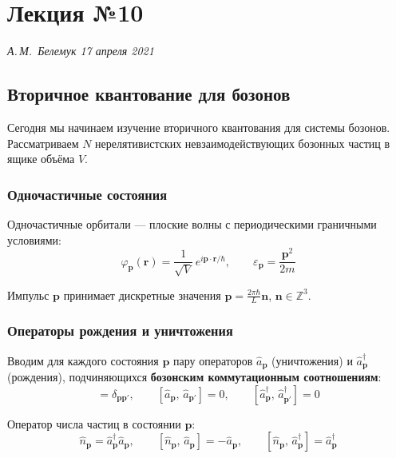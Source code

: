 \documentclass[../general/general]{subfiles}
\begin{document}
\chapter{Лекция №10}
\noindent\textit{А.\,М.~Белемук \hfill 17 апреля 2021}
\vspace{1em}
\ifSubfilesClassLoaded{\tableofcontents\newpage}{}


\section{Вторичное квантование для бозонов}

Сегодня мы начинаем изучение вторичного квантования для системы бозонов. Рассматриваем $N$ нерелятивистских невзаимодействующих бозонных частиц в ящике объёма $V$.

\subsection{Одночастичные состояния}

Одночастичные орбитали --- плоские волны с периодическими граничными условиями:
\begin{equation}
    \varphi_\mathbf{p}(\mathbf{r}) = \frac{1}{\sqrt{V}}\,e^{i\mathbf{p}\cdot\mathbf{r}/\hbar}, \qquad \varepsilon_\mathbf{p} = \frac{\mathbf{p}^2}{2m}
\end{equation}

Импульс $\mathbf{p}$ принимает дискретные значения $\mathbf{p} = \frac{2\pi\hbar}{L}\mathbf{n}$, $\mathbf{n} \in \mathbb{Z}^3$.

\subsection{Операторы рождения и уничтожения}

Вводим для каждого состояния $\mathbf{p}$ пару операторов $\hat{a}_\mathbf{p}$ (уничтожения) и $\hat{a}^\dagger_\mathbf{p}$ (рождения), подчиняющихся \textbf{бозонским коммутационным соотношениям}:
\begin{equation}
    [\hat{a}_\mathbf{p},\,\hat{a}^\dagger_{\mathbf{p}'}] = \delta_{\mathbf{p}\mathbf{p}'}, \qquad
    [\hat{a}_\mathbf{p},\,\hat{a}_{\mathbf{p}'}] = 0, \qquad
    [\hat{a}^\dagger_\mathbf{p},\,\hat{a}^\dagger_{\mathbf{p}'}] = 0
    \label{eq:bose_comm}
\end{equation}

Оператор числа частиц в состоянии $\mathbf{p}$:
\begin{equation}
    \hat{n}_\mathbf{p} = \hat{a}^\dagger_\mathbf{p}\hat{a}_\mathbf{p}, \qquad [\hat{n}_\mathbf{p},\,\hat{a}_\mathbf{p}] = -\hat{a}_\mathbf{p}, \qquad [\hat{n}_\mathbf{p},\,\hat{a}^\dagger_\mathbf{p}] = \hat{a}^\dagger_\mathbf{p}
\end{equation}
\end{document}
